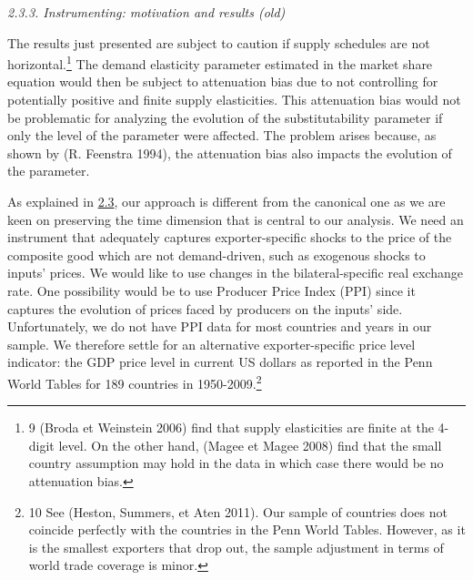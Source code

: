 \documentclass[12pt,twoside,a4paper,notitlepage]{article}
\begin{document}
\textit{2.3.3. Instrumenting: motivation and results (old)\label{mark-2.3.3.}}

The results just presented are subject to caution if supply schedules are not horizontal.\footnote{9 (Broda et Weinstein 2006) find that supply elasticities are finite at the 4-digit level. On the other hand, (Magee et Magee 2008) find that the small country assumption may hold in the data in which case there would be no attenuation bias.
} The demand elasticity parameter estimated in the market share equation would then be subject to attenuation bias due to not controlling for potentially positive and finite supply elasticities. This attenuation bias would not be problematic for analyzing the evolution of the substitutability parameter if only the level of the parameter were affected. The problem arises because, as shown by (R. Feenstra 1994), the attenuation bias also impacts the evolution of the parameter.

As explained in {\hyperref[ref-001]{2.3}}, our approach is different from the canonical one as we are keen on preserving the time dimension that is central to our analysis. We need an instrument that adequately captures exporter-specific shocks to the price of the composite good which are not demand-driven, such as exogenous shocks to inputs' prices. We would like to use changes in the bilateral-specific real exchange rate. One possibility would be to use Producer Price Index (PPI) since it captures the evolution of prices faced by producers on the inputs' side. Unfortunately, we do not have PPI data for most countries and years in our sample. We therefore settle for an alternative exporter-specific price level indicator: the GDP price level in current US dollars as reported in the Penn World Tables for 189 countries in 1950-2009.\footnote{10 See (Heston, Summers, et Aten 2011). Our sample of countries does not coincide perfectly with the countries in the Penn World Tables. However, as it is the smallest exporters that drop out, the sample adjustment in terms of world trade coverage is minor.
}
\end{document}
